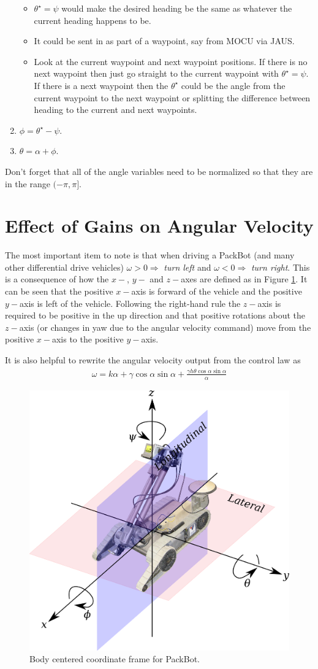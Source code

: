 \documentclass[12pt]{article}
\begin{document}
\begin{enumerate}
\begin{itemize}
\item $\theta^\star=\psi$ would make the desired heading be the same as whatever the current heading happens to be.
\item It could be sent in as part of a waypoint, say from MOCU via JAUS.
\item Look at the current waypoint and next waypoint positions. If there is no next waypoint then just go straight to the current waypoint with $\theta^\star=\psi$. If there is a next waypoint then the $\theta^\star$ could be the angle from the current waypoint to the next waypoint or splitting the difference between heading to the current and next waypoints.
\end{itemize}
\item $\phi=\theta^\star-\psi$.
\item $\theta=\alpha + \phi$.
\end{enumerate}
Don't forget that all of the angle variables need to be normalized so that they are in the range $(-\pi,\pi]$.

\section{Effect of Gains on Angular Velocity}
The most important item to note is that when driving a PackBot (and many other differential drive vehicles) $\omega>0\Rightarrow$ \textit{turn left} and $\omega<0\Rightarrow$ \textit{turn right}. This is a consequence of how the $x-$, $y-$ and $z-$axes are defined as in Figure \ref{fig:packbotaxes}. It can be seen that the positive $x-$axis is forward of the vehicle and the positive $y-$axis is left of the vehicle. Following the right-hand rule the $z-$axis is required to be positive in the up direction and that positive rotations about the $z-$axis (or changes in yaw due to the angular velocity command) move from the positive $x-$axis to the positive $y-$axis.

It is also helpful to rewrite the angular velocity output from the control law as
\begin{align*}
\omega = k\alpha + \gamma\cos\alpha\sin\alpha + \frac{\gamma h\theta\cos\alpha\sin\alpha}{\alpha}
\end{align*}

\begin{figure}[ht!]
	\centering
	\includegraphics[width=.5\textwidth]{images/packbotaxes}
	\caption{Body centered coordinate frame for PackBot.}
	\label{fig:packbotaxes}
\end{figure}
\end{document}
